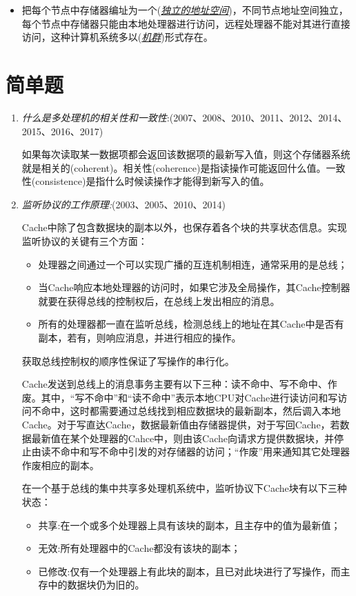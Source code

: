 \documentclass[a4paper]{ctexbook}
\newcommand{\blank}[1]{(\emph{\underline{#1}})}
\begin{document}
\begin{enumerate}
\begin{enumerate}
\begin{itemize}
      \item 把每个节点中存储器编址为一个\blank{独立的地址空间}，不同节点地址空间独立，每个节点中存储器只能由本地处理器进行访问，远程处理器不能对其进行直接访问，这种计算机系统多以\blank{机群}形式存在。
    \end{itemize}
  \end{enumerate}
\end{enumerate}

\section{简单题}
\begin{enumerate}
  
  \item \emph{什么是多处理机的相关性和一致性}:(2007、2008、2010、2011、2012、2014、2015、2016、2017)
  
  如果每次读取某一数据项都会返回该数据项的最新写入值，则这个存储器系统就是相关的(coherent)。相关性(coherence)是指读操作可能返回什么值。一致性(consistence)是指什么时候读操作才能得到新写入的值。
      
  \item \emph{监听协议的工作原理:}(2003、2005、2010、2014)
  
  Cache中除了包含数据块的副本以外，也保存着各个块的共享状态信息。实现监听协议的关键有三个方面：
  \begin{itemize}
    \item 处理器之间通过一个可以实现广播的互连机制相连，通常采用的是总线；
    \item 当Cache响应本地处理器的访问时，如果它涉及全局操作，其Cache控制器就要在获得总线的控制权后，在总线上发出相应的消息。
    \item 所有的处理器都一直在监听总线，检测总线上的地址在其Cache中是否有副本，若有，则响应消息，并进行相应的操作。
  \end{itemize}
  获取总线控制权的顺序性保证了写操作的串行化。
  
  Cache发送到总线上的消息事务主要有以下三种：读不命中、写不命中、作废。其中，“写不命中”和“读不命中”表示本地CPU对Cache进行读访问和写访问不命中，这时都需要通过总线找到相应数据块的最新副本，然后调入本地Cache。对于写直达Cache，数据最新值由存储器提供，对于写回Cache，若数据最新值在某个处理器的Cahce中，则由该Cache向请求方提供数据块，并停止由读不命中和写不命中引发的对存储器的访问；“作废”用来通知其它处理器作废相应的副本。
  
  在一个基于总线的集中共享多处理机系统中，监听协议下Cache块有以下三种状态：
  \begin{itemize}
    \item 共享:在一个或多个处理器上具有该块的副本，且主存中的值为最新值；
    \item 无效:所有处理器中的Cache都没有该块的副本；
    \item 已修改:仅有一个处理器上有此块的副本，且已对此块进行了写操作，而主存中的数据块仍为旧的。
  \end{itemize}
  

\end{enumerate}
\end{document}
